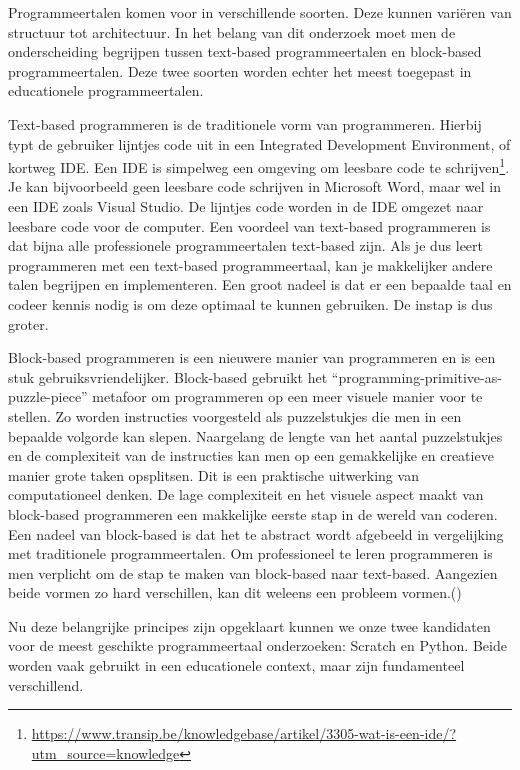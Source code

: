Programmeertalen komen voor in verschillende soorten. Deze kunnen variëren van structuur tot architectuur. In het belang van dit onderzoek moet men de onderscheiding begrijpen tussen text-based programmeertalen en block-based programmeertalen. Deze twee soorten worden echter het meest toegepast in educationele programmeertalen.

Text-based programmeren is de traditionele vorm van programmeren. Hierbij typt de gebruiker lijntjes code uit in een Integrated Development Environment, of kortweg IDE. Een IDE is simpelweg een omgeving om leesbare code te schrijven\footnote{\url{https://www.transip.be/knowledgebase/artikel/3305-wat-is-een-ide/?utm_source=knowledge}}. Je kan bijvoorbeeld geen leesbare code schrijven in Microsoft Word, maar wel in een IDE zoals Visual Studio. De lijntjes code worden in de IDE omgezet naar leesbare code voor de computer.
Een voordeel van text-based programmeren is dat bijna alle professionele programmeertalen text-based zijn. Als je dus leert programmeren met een text-based programmeertaal, kan je makkelijker andere talen begrijpen en implementeren. Een groot nadeel is dat er een bepaalde taal en codeer kennis nodig is om deze optimaal te kunnen gebruiken. De instap is dus groter. 

Block-based programmeren is een nieuwere manier van programmeren en is een stuk gebruiksvriendelijker. Block-based gebruikt het “programming-primitive-as-puzzle-piece” metafoor om programmeren op een meer visuele manier voor te stellen. Zo worden instructies voorgesteld als puzzelstukjes die men in een bepaalde volgorde kan slepen. Naargelang de lengte van het aantal puzzelstukjes en de complexiteit van de instructies kan men op een gemakkelijke en creatieve manier grote taken opsplitsen. Dit is een praktische uitwerking van computationeel denken. De lage complexiteit en het visuele aspect maakt van block-based programmeren een makkelijke eerste stap in de wereld van coderen. Een nadeel van block-based is dat het te abstract wordt afgebeeld in vergelijking met traditionele programmeertalen. Om professioneel te leren programmeren is men verplicht om de stap te maken van block-based naar text-based. Aangezien beide vormen zo hard verschillen, kan dit weleens een probleem vormen.(\cite{Weintrop2019})

Nu deze belangrijke principes zijn opgeklaart kunnen we onze twee kandidaten voor de meest geschikte programmeertaal onderzoeken: Scratch en Python. Beide worden vaak gebruikt in een educationele context, maar zijn fundamenteel verschillend. 

